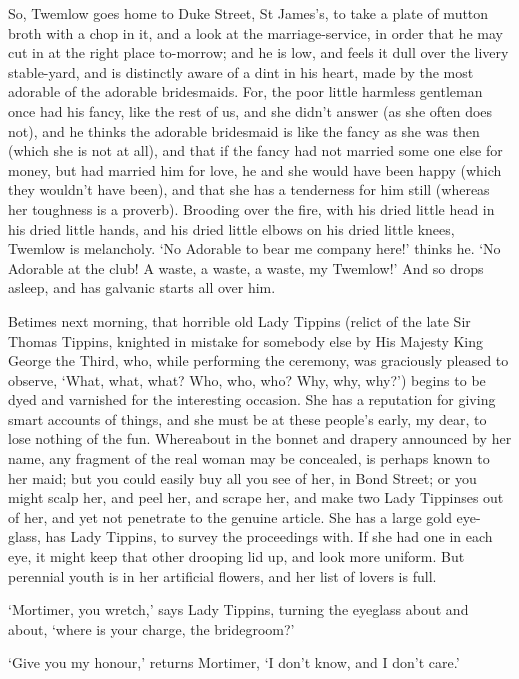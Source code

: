 So, Twemlow goes home to Duke Street, St James’s, to take a plate of
mutton broth with a chop in it, and a look at the marriage-service, in
order that he may cut in at the right place to-morrow; and he is low,
and feels it dull over the livery stable-yard, and is distinctly aware
of a dint in his heart, made by the most adorable of the adorable
bridesmaids. For, the poor little harmless gentleman once had his fancy,
like the rest of us, and she didn’t answer (as she often does not),
and he thinks the adorable bridesmaid is like the fancy as she was then
(which she is not at all), and that if the fancy had not married some
one else for money, but had married him for love, he and she would
have been happy (which they wouldn’t have been), and that she has a
tenderness for him still (whereas her toughness is a proverb). Brooding
over the fire, with his dried little head in his dried little hands,
and his dried little elbows on his dried little knees, Twemlow is
melancholy. ‘No Adorable to bear me company here!’ thinks he. ‘No
Adorable at the club! A waste, a waste, a waste, my Twemlow!’ And so
drops asleep, and has galvanic starts all over him.

Betimes next morning, that horrible old Lady Tippins (relict of the late
Sir Thomas Tippins, knighted in mistake for somebody else by His
Majesty King George the Third, who, while performing the ceremony, was
graciously pleased to observe, ‘What, what, what? Who, who, who?
Why, why, why?’) begins to be dyed and varnished for the interesting
occasion. She has a reputation for giving smart accounts of things, and
she must be at these people’s early, my dear, to lose nothing of the
fun. Whereabout in the bonnet and drapery announced by her name, any
fragment of the real woman may be concealed, is perhaps known to her
maid; but you could easily buy all you see of her, in Bond Street; or
you might scalp her, and peel her, and scrape her, and make two Lady
Tippinses out of her, and yet not penetrate to the genuine article. She
has a large gold eye-glass, has Lady Tippins, to survey the proceedings
with. If she had one in each eye, it might keep that other drooping
lid up, and look more uniform. But perennial youth is in her artificial
flowers, and her list of lovers is full.

‘Mortimer, you wretch,’ says Lady Tippins, turning the eyeglass about
and about, ‘where is your charge, the bridegroom?’

‘Give you my honour,’ returns Mortimer, ‘I don’t know, and I don’t
care.’

